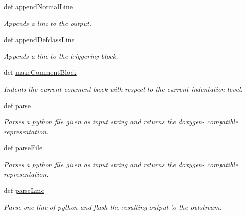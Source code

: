 \begin{DoxyCompactItemize}
def \hyperlink{classmitgcm_1_1doxypy_1_1Doxypy_a2daf300a0538b86a111d73d00210b3f1}{append\+Normal\+Line}
\begin{DoxyCompactList}\small\item\em Appends a line to the output. \end{DoxyCompactList}\item 
def \hyperlink{classmitgcm_1_1doxypy_1_1Doxypy_a04dcfaf941bc48246ee4e954057d0764}{append\+Defclass\+Line}
\begin{DoxyCompactList}\small\item\em Appends a line to the triggering block. \end{DoxyCompactList}\item 
def \hyperlink{classmitgcm_1_1doxypy_1_1Doxypy_ab5cbd9568469c013711077b7313d02c8}{make\+Comment\+Block}
\begin{DoxyCompactList}\small\item\em Indents the current comment block with respect to the current indentation level. \end{DoxyCompactList}\item 
def \hyperlink{classmitgcm_1_1doxypy_1_1Doxypy_ad2986dff09f416f35bdcc7145c726018}{parse}
\begin{DoxyCompactList}\small\item\em Parses a python file given as input string and returns the doxygen-\/ compatible representation. \end{DoxyCompactList}\item 
def \hyperlink{classmitgcm_1_1doxypy_1_1Doxypy_a76ccfc96c1fa64ea1a39c3ce6786309f}{parse\+File}
\begin{DoxyCompactList}\small\item\em Parses a python file given as input string and returns the doxygen-\/ compatible representation. \end{DoxyCompactList}\item 
def \hyperlink{classmitgcm_1_1doxypy_1_1Doxypy_a75196a4d6d2c23491440799c7c4642ab}{parse\+Line}
\begin{DoxyCompactList}\small\item\em Parse one line of python and flush the resulting output to the outstream. \end{DoxyCompactList}\end{DoxyCompactItemize}
